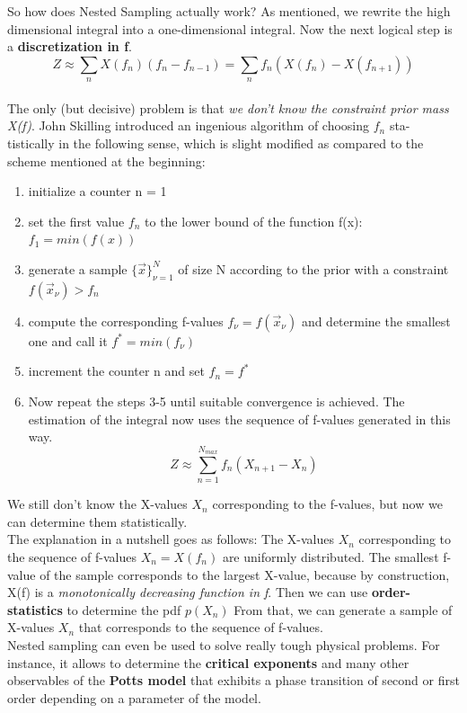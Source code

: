 \documentclass[12pt, a4paper]{scrartcl}
\begin{document}
So how does Nested Sampling actually work?
As mentioned, we rewrite the high dimensional integral into a one-dimensional integral.
Now the next logical step is a  \textbf{discretization in f}.\\%
\begin{equation*}\boxed{Z\approx\sum_nX(f_n)(f_n-f_{n-1})=\sum_nf_n(X(f_n)-X(f_{n+1}))
}\end{equation*}\\
The only (but decisive) problem is that \textit{we don’t know the constraint prior mass
X(f)}. John Skilling introduced an ingenious algorithm of choosing $f_n$ sta-
tistically in the following sense, which is slight modiﬁed as compared to the
scheme mentioned at the beginning:
\begin{enumerate}
\item initialize a counter n = 1
\item set the ﬁrst value $f_n$ to the lower bound of the function f(x): $f_1=min(f(x))$
\item generate a sample $\{\vec{x}\}_{\nu=1}^N$ of size N according to the prior with a
constraint $f(\vec{x}_{\nu}) > f_n$
\item compute the corresponding f-values $f_{\nu}=f(\vec{x}_{\nu})$ and determine the smallest
one and call it $f^*=min(f_{\nu})$
\item increment the counter n and set $f_n=f^*$

\item Now repeat the steps 3-5 until suitable convergence is achieved.
The estimation of the integral now uses the sequence of f-values generated in
this way.
\[Z\approx\sum_{n=1}^{N_{max}}f_n(X_{n+1}-X_n)\]
\end{enumerate}
We still don’t know the X-values $X_n$ corresponding to the f-values, but
now we can determine them statistically.\\

The explanation in a nutshell goes as follows: The X-values $X_n$ corresponding to the sequence of f-values $X_n=X(f_n)$ are uniformly distributed. The smallest
f-value of the sample corresponds to the largest X-value, because by construction, X(f) is a \textit{monotonically decreasing function in f}. Then we can use
 \textbf{order-statistics} to determine the pdf $p(X_n)$ From that, we can generate a
sample of X-values $X_n$ that corresponds to the sequence of f-values.\\

Nested sampling can even be used to solve really tough physical problems.
For instance, it allows to determine the  \textbf{critical exponents} and many other observables
of the  \textbf{Potts model} that exhibits a phase transition of second or ﬁrst order
depending on a parameter of the model.\\
\end{document}
